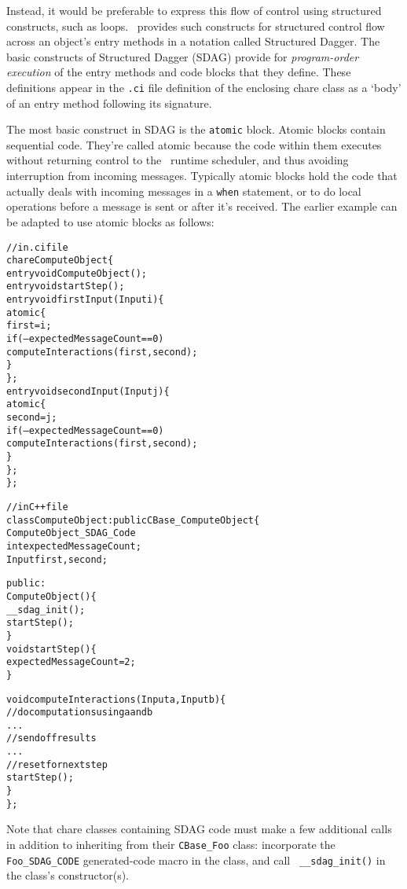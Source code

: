 Instead, it would be preferable to express this flow of control using
structured constructs, such as loops. \charmpp\ provides such constructs for
structured control flow across an object's entry methods in a notation called
Structured Dagger. The basic constructs of Structured Dagger (SDAG) provide for
\emph{program-order execution} of the entry methods and code blocks that they
define. These definitions appear in the {\tt .ci} file definition of the
enclosing chare class as a `body' of an entry method following its signature.

The most basic construct in SDAG is the {\tt atomic} block. Atomic blocks
contain sequential \CC code.  They're called atomic because the code within
them executes without returning control to the \charmpp\ runtime scheduler, and
thus avoiding interruption from incoming messages. Typically atomic blocks hold
the code that actually deals with incoming messages in a {\tt when} statement,
or to do local operations before a message is sent or after it's received. The
earlier example can be adapted to use atomic blocks as follows:
\begin{center}
\begin{alltt}
// in .ci file
chare ComputeObject \{
  entry void ComputeObject();
  entry void startStep();
  entry void firstInput(Input i) \{
    atomic \{
      first = i;
      if (--expectedMessageCount == 0)
        computeInteractions(first, second);
    \}
  \};
  entry void secondInput(Input j) \{
    atomic \{
      second = j;
      if (--expectedMessageCount == 0)
        computeInteractions(first, second);
    \}
  \};
\};

// in C++ file
class ComputeObject : public CBase\_ComputeObject \{
  ComputeObject\_SDAG\_Code
  int   expectedMessageCount;
  Input first, second;

public:
  ComputeObject() \{
    __sdag_init();
    startStep();
  \}
  void startStep() \{
    expectedMessageCount = 2;
  \}

  void computeInteractions(Input a, Input b) \{
    // do computations using a and b
    . . .
    // send off results
    . . .
    // reset for next step
    startStep();
  \}
\};
\end{alltt}
\end{center}
Note that chare classes containing SDAG code must make a few additional calls
in addition to inheriting from their {\tt CBase\_Foo} class: incorporate the
{\tt Foo\_SDAG\_CODE} generated-code macro in the class, and call {\tt
  \_\_sdag\_init()} in the class's constructor(s).


